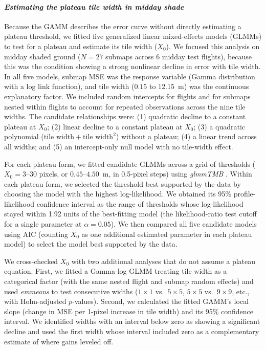 \documentclass[12pt]{article}
\begin{document}
\paragraph*{\textit{Estimating the plateau tile width in midday shade}}
Because the GAMM describes the error curve without directly estimating a plateau threshold, we fitted five generalized linear mixed-effects models (GLMMs) to test for a plateau and estimate its tile width ($X_0$). We focused this analysis on midday shaded ground ($N = 27$ submaps across 6 midday test flights), because this was the condition showing a strong nonlinear decline in error with tile width. In all five models, submap MSE was the response variable (Gamma distribution with a log link function), and tile width ($0.15$ to $12.15$~m) was the continuous explanatory factor. We included random intercepts for flights and for submaps nested within flights to account for repeated observations across the nine tile widths. The candidate relationships were: (1) quadratic decline to a constant plateau at $X_0$; (2) linear decline to a constant plateau at $X_0$; (3) a quadratic polynomial ($\text{tile width} + \text{tile width}^2$) without a plateau; (4) a linear trend across all widths; and (5) an intercept-only null model with no tile-width effect.

For each plateau form, we fitted candidate GLMMs across a grid of thresholds ($X_0 = 3$--$30$ pixels, or $0.45$--$4.50$~m, in 0.5-pixel steps) using \textit{glmmTMB} \citep{brooks2017glmmtmb}. Within each plateau form, we selected the threshold best supported by the data by choosing the model with the highest log-likelihood. We obtained its 95\% profile-likelihood confidence interval as the range of thresholds whose log-likelihood stayed within 1.92 units of the best-fitting model (the likelihood-ratio test cutoff for a single parameter at $\alpha = 0.05$). We then compared all five candidate models using AIC (counting $X_0$ as one additional estimated parameter in each plateau model) to select the model best supported by the data.

We cross-checked $X_0$ with two additional analyses that do not assume a plateau equation. First, we fitted a Gamma-log GLMM treating tile width as a categorical factor (with the same nested flight and submap random effects) and used \textit{emmeans} \citep{Lenth2024emmeans} to test consecutive widths ($1\times1$ vs.\ $5\times5$, $5\times5$ vs.\ $9\times9$, etc., with Holm-adjusted $p$-values). Second, we calculated the fitted GAMM's local slope (change in MSE per 1-pixel increase in tile width) and its 95\% confidence interval. We identified widths with an interval below zero as showing a significant decline and used the first width whose interval included zero as a complementary estimate of where gains leveled off.
\end{document}
